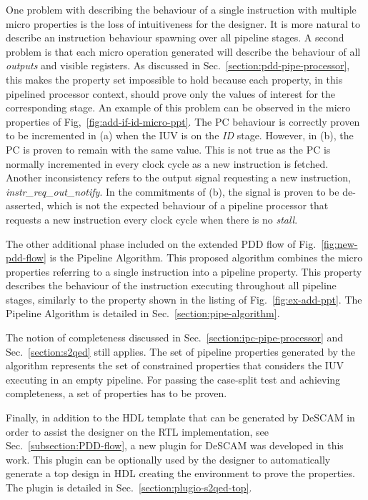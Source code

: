 One problem with describing the behaviour of a single instruction with multiple micro properties is the loss of intuitiveness for the designer. It is more natural to describe an instruction behaviour spawning over all pipeline stages. A second problem is that each micro operation generated will describe the behaviour of all \textit{outputs} and visible registers. As discussed in Sec.~\ref{section:pdd-pipe-processor}, this makes the property set impossible to hold because each property, in this pipelined processor context, should prove only the values of interest for the corresponding stage. An example of this problem can be observed in the micro properties of Fig,~\ref{fig:add-if-id-micro-ppt}. The PC behaviour is correctly proven to be incremented in (a) when the IUV is on the \textit{ID} stage. However, in (b), the PC is proven to remain with the same value. This is not true as the PC is normally incremented in every clock cycle as a new instruction is fetched. Another inconsistency refers to the output signal requesting a new instruction, \textit{instr\_req\_out\_notify}. In the  commitments of (b), the signal is proven to be de-asserted, which is not the expected behaviour of a pipeline processor that requests a new instruction every clock cycle when there is no \textit{stall}.

The other additional phase included on the extended PDD flow of Fig.~\ref{fig:new-pdd-flow} is the Pipeline Algorithm. This proposed algorithm combines the micro properties referring to a single instruction into a pipeline property. This property describes the behaviour of the instruction executing throughout all pipeline stages, similarly to the property shown in the listing of Fig.~\ref{fig:ex-add-ppt}. The Pipeline Algorithm is detailed in Sec.~\ref{section:pipe-algorithm}.

The notion of completeness discussed in Sec.~\ref{section:ipc-pipe-processor} and Sec.~\ref{section:s2qed} still applies. The set of pipeline properties generated by the algorithm represents the set of constrained properties that considers the IUV executing in an empty pipeline. For passing the case-split test and achieving completeness, a set of \SSQED{} properties has to be proven.

Finally, in addition to the HDL template that can be generated by DeSCAM in order to assist the designer on the RTL implementation, see Sec.~\ref{subsection:PDD-flow}, a new plugin  for DeSCAM was developed in this work. This plugin can be optionally used by the designer to automatically generate a top design in HDL creating the environment to prove the \SSQED{} properties. The plugin is detailed in Sec.~\ref{section:plugio-s2qed-top}.

